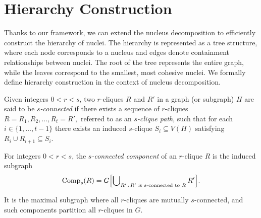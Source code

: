 

\section{Hierarchy Construction}
\label{sec:hierarchy}

Thanks to our framework, we can extend the nucleus decomposition to efficiently construct the hierarchy of nuclei. 
The hierarchy is represented as a tree structure, where each node corresponds to a nucleus and edges denote containment relationships between nuclei. 
The root of the tree represents the entire graph, while the leaves correspond to the smallest, most cohesive nuclei. 
We formally define hierarchy construction in the context of nucleus decomposition.

\begin{definition}[$s$-Connectivity]\label{def:s-connect}
Given integers $0 < r < s$,  
two $r$-cliques $R$ and $R'$ in a graph (or subgraph) $H$ are said to be \emph{$s$-connected} 
if there exists a sequence of $r$-cliques
$
  R = R_1, R_2, \dots, R_t = R',
$
referred to as an \emph{$s$-clique path},  
such that for each $i \in \{1, \dots, t-1\}$ there exists an induced $s$-clique
$S_i \subseteq V(H)$ satisfying $R_i \cup R_{i+1} \subseteq S_i$.
\end{definition}


\begin{definition}\label{def:s-component}
For integers $0 < r < s$,  
the \emph{$s$-connected component} of an $r$-clique $R$ is the induced subgraph
\[
  \mathrm{Comp}_s(R)
  = G\, \!\Bigl[\, \!\bigcup\nolimits_{R'\,:\,R'\text{ is }s\text{-connected to }R} R'\Bigr].
\]
\end{definition}

It is the maximal subgraph where all $r$-cliques are mutually $s$-connected, and such components partition all $r$-cliques in $G$.




